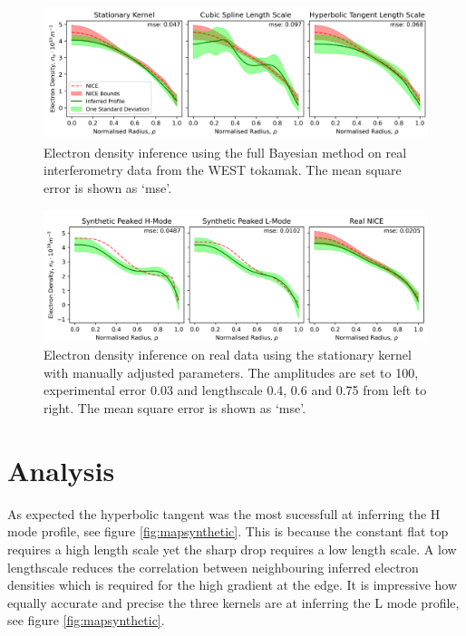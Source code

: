 \begin{figure}[H]
    \centering
    \includegraphics[width=\textwidth]{images/Final/FB_real.png}
    \caption{Electron density inference using the full Bayesian method on real interferometry data from the WEST tokamak. The mean square error is shown as `mse'.}
    \label{fig:fb_real}
\end{figure}

\begin{figure}[H]
    \centering
    \includegraphics[width=\textwidth]{images/Final/manual.png}
    \caption{Electron density inference on real data using the stationary kernel with manually adjusted parameters. The amplitudes are set to 100, experimental error 0.03 and lengthscale 0.4, 0.6 and 0.75 from left to right. The mean square error is shown as `mse'.}
    \label{fig:manual}
\end{figure}

\section{Analysis}

As expected the hyperbolic tangent was the most sucessfull at inferring the H mode profile, see figure \ref{fig:mapsynthetic}. This is because the constant flat top requires a high length scale yet the sharp drop requires a low length scale. A low lengthscale reduces the correlation between neighbouring inferred electron densities which is required for the high gradient at the edge. It is impressive how equally accurate and precise the three kernels are at inferring the L mode profile, see figure \ref{fig:mapsynthetic}.


